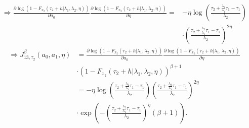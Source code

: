 \documentclass{article}
\begin{document}
\begin{align*}
\Rightarrow \frac{\partial \log\left(1-F_{x_2}(\tau_2+h|\lambda_1,\lambda_2,\eta)\right)}{\partial a_0}\frac{\partial \log\left(1-F_{x_2}(\tau_2+h|\lambda_1,\lambda_2,\eta)\right)}{\partial \eta}=& -\eta\log\left(\frac{\tau_2+\frac{\lambda_2}{\lambda_1}\tau_1-\tau_1}{\lambda_2}\right)
\\
&\cdot \left(\frac{\tau_2+\frac{\lambda_2}{\lambda_1}\tau_1-\tau_1}{\lambda_2}\right)^{2\eta}
\end{align*}
\begin{align*}
\Rightarrow  J_{13,\tau_2}^{\beta}(a_0,a_1,\eta)&=\frac{\partial \log\left(1-F_{x_2}(\tau_2+h|\lambda_1,\lambda_2,\eta)\right)}{\partial a_0}\frac{\partial \log\left(1-F_{x_2}(\tau_2+h|\lambda_1,\lambda_2,\eta)\right)}{\partial \eta}
\\
&\cdot \left(1-F_{x_2}(\tau_2+h|\lambda_1,\lambda_2,\eta)\right)^{\beta+1}
\\
&=-\eta\log\left(\frac{\tau_2+\frac{\lambda_2}{\lambda_1}\tau_1-\tau_1}{\lambda_2}\right)\left(\frac{\tau_2+\frac{\lambda_2}{\lambda_1}\tau_1-\tau_1}{\lambda_2}\right)^{2\eta}
\\
&\cdot \exp\left(-\left(\frac{\tau_2+\frac{\lambda_2}{\lambda_1}\tau_1-\tau_1}{\lambda_2}\right)^\eta(\beta+1)\right).
\end{align*}
\end{document}
